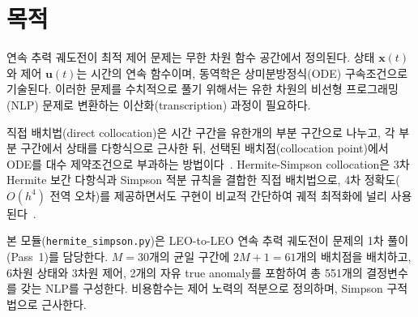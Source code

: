 \documentclass[11pt]{article}
\begin{document}
\drawborder
\thispagestyle{firstpage}

\def\lighterdate{February 12, 2026}

\begin{abstract}
연속 추력 궤도전이 최적 제어 문제는 무한 차원 함수 공간에서 정의된다. 이를 수치적으로 풀기 위해 직접 배치법(direct collocation)을 사용하여 유한 차원의 비선형 프로그래밍(NLP) 문제로 변환한다. 본 보고서에서는 Hermite-Simpson collocation의 수학적 배경, 구현 매핑, 수치 검증을 체계적으로 기술한다. 3차 Hermite 보간 다항식과 Simpson 적분 규칙을 결합하여 $O(h^4)$ 전역 오차를 달성하는 이산화 기법을 유도하고, $M = 30$ 구간에 551개의 결정변수와 494개의 제약조건으로 구성되는 NLP의 구조를 상세히 설명한다.
\end{abstract}

\section{목적}
\label{sec:purpose}

연속 추력 궤도전이 최적 제어 문제는 무한 차원 함수 공간에서 정의된다. 상태 $\mathbf{x}(t)$와 제어 $\mathbf{u}(t)$는 시간의 연속 함수이며, 동역학은 상미분방정식(ODE) 구속조건으로 기술된다. 이러한 문제를 수치적으로 풀기 위해서는 유한 차원의 비선형 프로그래밍(NLP) 문제로 변환하는 이산화(transcription) 과정이 필요하다.

직접 배치법(direct collocation)은 시간 구간을 유한개의 부분 구간으로 나누고, 각 부분 구간에서 상태를 다항식으로 근사한 뒤, 선택된 배치점(collocation point)에서 ODE를 대수 제약조건으로 부과하는 방법이다~\cite{Hargraves1987}. Hermite-Simpson collocation은 3차 Hermite 보간 다항식과 Simpson 적분 규칙을 결합한 직접 배치법으로, 4차 정확도($O(h^4)$ 전역 오차)를 제공하면서도 구현이 비교적 간단하여 궤적 최적화에 널리 사용된다~\cite{Betts1998, Betts2010}.

본 모듈(\texttt{hermite\_simpson.py})은 LEO-to-LEO 연속 추력 궤도전이 문제의 1차 풀이(Pass~1)를 담당한다. $M = 30$개의 균일 구간에 $2M + 1 = 61$개의 배치점을 배치하고, 6차원 상태와 3차원 제어, 2개의 자유 true anomaly를 포함하여 총 551개의 결정변수를 갖는 NLP를 구성한다. 비용함수는 제어 노력의 적분으로 정의하며, Simpson 구적법으로 근사한다.
\end{document}

